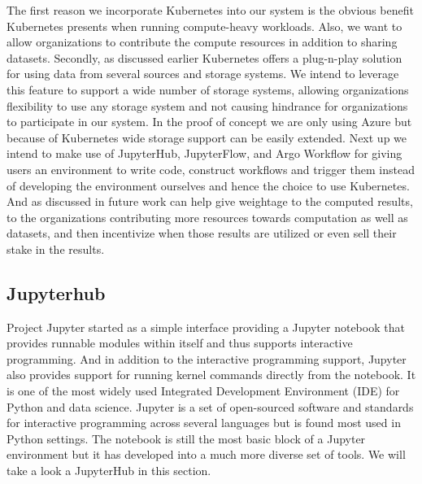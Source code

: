 \bigskip
The first reason we incorporate Kubernetes into our system is the obvious benefit Kubernetes presents when running compute-heavy workloads. Also, we want to allow organizations to contribute the compute resources in addition to sharing datasets. Secondly, as discussed earlier Kubernetes offers a plug-n-play solution for using data from several sources and storage systems. We intend to leverage this feature to support a wide number of storage systems, allowing organizations flexibility to use any storage system and not causing hindrance for organizations to participate in our system. In the proof of concept we are only using Azure but because of Kubernetes wide storage support can be easily extended. Next up we intend to make use of JupyterHub, JupyterFlow, and Argo Workflow for giving users an environment to write code, construct workflows and trigger them instead of developing the environment ourselves and hence the choice to use Kubernetes. And as discussed in future work can help give weightage to the computed results, to the organizations contributing more resources towards computation as well as datasets, and then incentivize when those results are utilized or even sell their stake in the results.

\subsection{Jupyterhub}
Project Jupyter started as a simple interface providing a Jupyter notebook that provides runnable modules within itself and thus supports interactive programming. And in addition to the interactive programming support, Jupyter also provides support for running kernel commands directly from the notebook. It is one of the most widely used Integrated Development Environment (IDE) for Python and data science. Jupyter is a set of open-sourced software and standards for interactive programming across several languages but is found most used in Python settings. The notebook is still the most basic block of a Jupyter environment but it has developed into a much more diverse set of tools. We will take a look a JupyterHub in this section.

